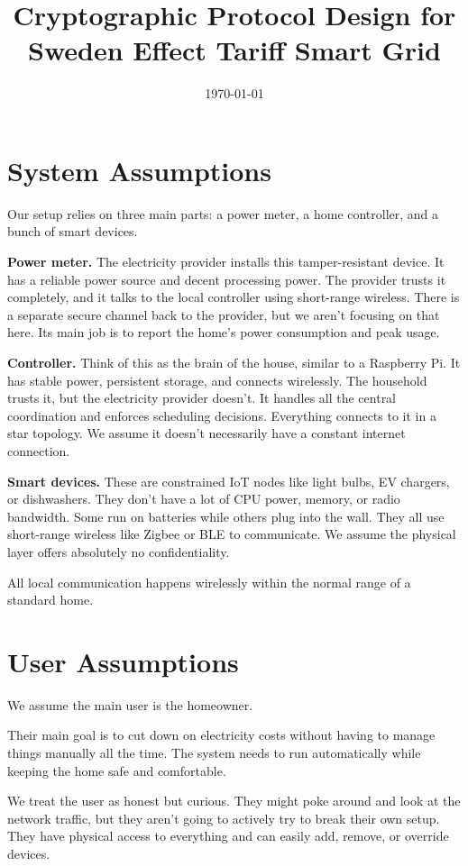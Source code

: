 \documentclass[a4paper,11pt]{article}
\title{Cryptographic Protocol Design for Sweden Effect Tariff Smart Grid}
\author{}
\date{\today}
\begin{document}
\maketitle
\tableofcontents
\newpage

\section{System Assumptions}

Our setup relies on three main parts: a power meter, a home controller, and a bunch of smart devices.

\textbf{Power meter.} The electricity provider installs this tamper-resistant device. It has a reliable power source and decent processing power. The provider trusts it completely, and it talks to the local controller using short-range wireless. There is a separate secure channel back to the provider, but we aren't focusing on that here. Its main job is to report the home's power consumption and peak usage.

\textbf{Controller.} Think of this as the brain of the house, similar to a Raspberry Pi. It has stable power, persistent storage, and connects wirelessly. The household trusts it, but the electricity provider doesn't. It handles all the central coordination and enforces scheduling decisions. Everything connects to it in a star topology. We assume it doesn't necessarily have a constant internet connection.

\textbf{Smart devices.} These are constrained IoT nodes like light bulbs, EV chargers, or dishwashers. They don't have a lot of CPU power, memory, or radio bandwidth. Some run on batteries while others plug into the wall. They all use short-range wireless like Zigbee or BLE to communicate. We assume the physical layer offers absolutely no confidentiality.

All local communication happens wirelessly within the normal range of a standard home.

\section{User Assumptions}

We assume the main user is the homeowner.

Their main goal is to cut down on electricity costs without having to manage things manually all the time. The system needs to run automatically while keeping the home safe and comfortable.

We treat the user as honest but curious. They might poke around and look at the network traffic, but they aren't going to actively try to break their own setup. They have physical access to everything and can easily add, remove, or override devices.
\end{document}
